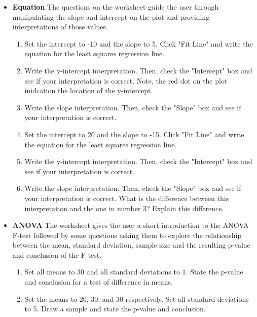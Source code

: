 \documentclass[11pt]{book}
\begin{document}
\begin{itemize}
\begin{enumerate}
\end{enumerate}

\item {\bf Equation} The questions on the worksheet guide the user through manipulating the slope and intercept on the plot and providing interpretations of those values.

\begin{enumerate}
\item Set the intercept to -10 and the slope to 5. Click "Fit Line" and write the equation for the least squares regression line.

\item Write the y-intercept interpretation. Then, check the "Intercept" box and see if your interpretation is correct. Note, the red dot on the plot inidcation the location of the y-intercept.

\item Write the slope interpretation. Then, check the "Slope" box and see if your interpretation is correct.

\item Set the intercept to 20 and the slope to -15. Click "Fit Line" and write the equation for the least squares regression line.

\item Write the y-intercept interpretation. Then, check the "Intercept" box and see if your interpretation is correct.

\item Write the slope interpretation. Then, check the "Slope" box and see if your interpretation is correct. What is the difference between this interpretation and the one in number 3? Explain this difference.

\end{enumerate}
  
\item {\bf ANOVA} The worksheet gives the user a short introduction to the ANOVA F-test followed by some questions asking them to explore the relationship between the mean, standard deviation, sample size and the resulting p-value and conclusion of the F-test. 

\begin{enumerate}
\item Set all means to 30 and all standard deviations to 1.  State the p-value and conclusion for a test of difference in means.

\item Set the means to 20, 30, and 30 respectively.  Set all standard deviations to 5.  Draw a sample and state the p-value and conclusion.  


\end{enumerate}
\end{itemize}
\end{document}
